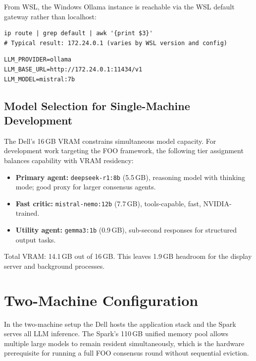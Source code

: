 From WSL, the Windows Ollama instance is reachable via the WSL default
gateway rather than localhost:

\begin{lstlisting}[style=bashstyle, caption={Find the Windows gateway IP from WSL}]
ip route | grep default | awk '{print $3}'
# Typical result: 172.24.0.1 (varies by WSL version and config)
\end{lstlisting}

\begin{lstlisting}[style=bashstyle, caption={.env for WSL accessing Windows Ollama}]
LLM_PROVIDER=ollama
LLM_BASE_URL=http://172.24.0.1:11434/v1
LLM_MODEL=mistral:7b
\end{lstlisting}

\subsection{Model Selection for Single-Machine Development}

The Dell's 16\,GB VRAM constrains simultaneous model capacity. For
development work targeting the FOO framework, the following tier
assignment balances capability with VRAM residency:

\begin{itemize}
  \item \textbf{Primary agent:} \texttt{deepseek-r1:8b} (5.5\,GB),
        reasoning model with thinking mode; good proxy for larger
        consensus agents.
  \item \textbf{Fast critic:} \texttt{mistral-nemo:12b} (7.7\,GB),
        tools-capable, fast, NVIDIA-trained.
  \item \textbf{Utility agent:} \texttt{gemma3:1b} (0.9\,GB),
        sub-second responses for structured output tasks.
\end{itemize}

Total VRAM: 14.1\,GB out of 16\,GB. This leaves 1.9\,GB headroom for
the display server and background processes.

\section{Two-Machine Configuration}
\label{sec:two-machine}

In the two-machine setup the Dell hosts the application stack and the
Spark serves all LLM inference. The Spark's 110\,GB unified memory pool
allows multiple large models to remain resident simultaneously, which is
the hardware prerequisite for running a full FOO consensus round without
sequential eviction.


